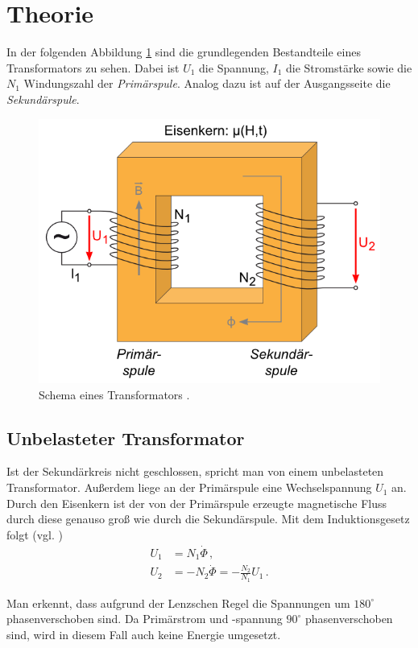 \documentclass[12pt,a4paper,titlepage,headinclude,bibtotoc]{scrartcl}
\begin{document}
\section{Theorie}
\label{sec:theorie}
In der folgenden Abbildung \ref{fig:TrafoSchema} sind die grundlegenden Bestandteile eines Transformators zu sehen.
Dabei ist $U_1$ die Spannung, $I_1$ die Stromstärke sowie die $N_1$ Windungszahl der \textit{Primärspule}.
Analog dazu ist auf der Ausgangsseite die \textit{Sekundärspule}.
\begin{figure}[!htb]
	\centering
	\includegraphics[scale=0.75]{TrafoSchema.png}
	\caption{Schema eines Transformators \cite[Datum: 01.09.2014]{LP16}.}
	\label{fig:TrafoSchema}
\end{figure}

\subsection{Unbelasteter Transformator}
Ist der Sekundärkreis nicht geschlossen, spricht man von einem unbelasteten Transformator.
Außerdem liege an der Primärspule eine Wechselspannung $U_1$ an.
Durch den Eisenkern ist der von der Primärspule erzeugte magnetische Fluss durch diese genauso groß wie durch die Sekundärspule.
Mit dem Induktionsgesetz folgt (vgl. \cite[S.432]{gerthsen})
\begin{align*}
	U_1&=N_1 \dot{\Phi} \,,\\
	U_2&=-N_2\dot{\Phi}=-\frac{N_2}{N_1}U_1\,.
\end{align*}

Man erkennt, dass aufgrund der Lenzschen Regel die Spannungen um $180^\circ$ phasenverschoben sind.
Da Primärstrom und -spannung $90^\circ$ phasenverschoben sind, wird in diesem Fall auch keine Energie umgesetzt.
\end{document}
